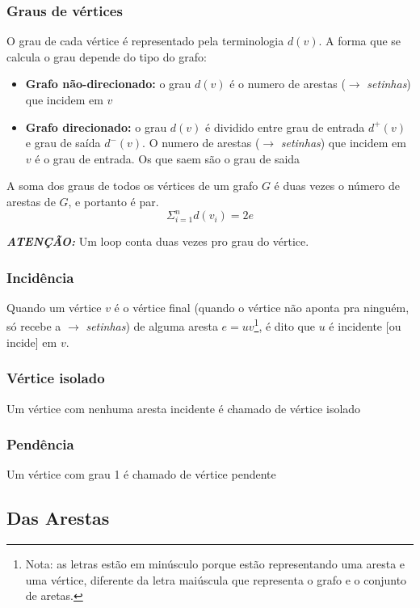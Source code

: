 \documentclass[12pt]{article}
\begin{document}
\subsubsection{Graus de vértices}
O grau de cada vértice é representado pela terminologia $d(v)$.
A forma que se calcula o grau depende do tipo do grafo:
\begin{itemize}
	\item \textbf{Grafo não-direcionado:} o grau $d(v)$ é o numero de arestas ($\longrightarrow$ \textit{setinhas}) que incidem em $v$
	\item \textbf{Grafo direcionado:} o grau $d(v)$ é dividido entre grau de entrada $d^+(v)$ e grau de saída $d^-(v)$.
	      O numero de arestas ($\longrightarrow$ \textit{setinhas}) que incidem em $v$ é o grau de entrada.
	      Os que saem são o grau de saida
\end{itemize}

A soma dos graus de todos os vértices de um grafo $G$ é duas vezes o número de arestas de $G$, e portanto é par.
\begin{equation}
	\Sigma_{i=1}^n d(v_i) = 2e
\end{equation}

\textbf{\textit{ATENÇÃO:}} Um loop conta duas vezes pro grau do vértice.

\subsubsection{Incidência}
Quando um vértice $v$ é o vértice final (quando o vértice não aponta pra ninguém, só recebe a $\longrightarrow$ \textit{setinhas}) de alguma aresta $e = uv$\footnote{
	Nota: as letras estão em minúsculo porque estão representando uma aresta e uma vértice, diferente da letra maiúscula que representa o grafo e o conjunto de aretas.
}, é dito que $u$ é incidente [ou incide] em $v$.

\subsubsection{Vértice isolado}
Um vértice com nenhuma aresta incidente é chamado de vértice isolado

\subsubsection{Pendência}
Um vértice com grau 1 é chamado de vértice pendente

\subsection{Das Arestas}
\end{document}
